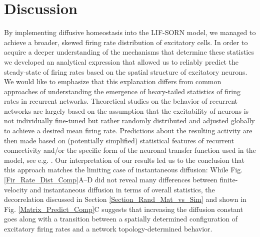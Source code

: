 \documentclass[10pt,letterpaper]{article}
\begin{document}
\section*{Discussion}
By implementing diffusive homeostasis into the LIF-SORN model, we managed to achieve a broader, skewed firing rate distribution of excitatory cells. In order to acquire a deeper understanding of the mechanisms that determine these statistics we developed an analytical expression that allowed us to reliably predict the steady-state of firing rates based on the spatial structure of excitatory neurons. We would like to emphasize that this explanation differs from common approaches of understanding the emergence of heavy-tailed statistics of firing rates in recurrent networks. Theoretical studies on the behavior of recurrent networks are largely based on the assumption that the excitability of neurons is not individually fine-tuned but rather randomly distributed and adjusted globally to achieve a desired mean firing rate. Predictions about the resulting activity are then made based on (potentially simplified) statistical features of recurrent connectivity and/or the specific form of the neuronal transfer function used in the model, see e.g. \cite{Roxin_Firing_Rate_Distribution,Vreeswijk1998,Koulakov_2009}. Our interpretation of our results led us to the conclusion that this approach matches the limiting case of instantaneous diffusion: While Fig. \ref{Fir_Rate_Dist_Comp}A--D did not reveal many differences between finite-velocity and instantaneous diffusion in terms of overall statistics, the decorrelation discussed in Section \ref{Section_Rand_Mat_vs_Sim} and shown in Fig. \ref{Matrix_Predict_Comp}C suggests that increasing the diffusion constant goes along with a transition between a spatially determined configuration of excitatory firing rates and a network topology-determined behavior.
\end{document}
